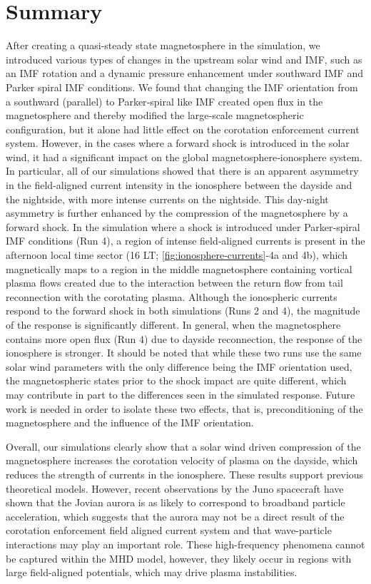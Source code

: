 \section{Summary}
After creating a quasi‐steady state magnetosphere in the simulation, we introduced various types of changes in the upstream solar wind and IMF, such as an IMF rotation and a dynamic pressure enhancement under southward IMF and Parker spiral IMF conditions. We found that changing the IMF orientation from a southward (parallel) to Parker‐spiral like IMF created open flux in the magnetosphere and thereby modified the large‐scale magnetospheric configuration, but it alone had little effect on the corotation enforcement current system. However, in the cases where a forward shock is introduced in the solar wind, it had a significant impact on the global magnetosphere‐ionosphere system. In particular, all of our simulations showed that there is an apparent asymmetry in the field‐aligned current intensity in the ionosphere between the dayside and the nightside, with more intense currents on the nightside. This day‐night asymmetry is further enhanced by the compression of the magnetosphere by a forward shock. In the simulation where a shock is introduced under Parker‐spiral IMF conditions (Run 4), a region of intense field‐aligned currents is present in the afternoon local time sector (16 LT; \ref{fig:ionosphere-currents}‐4a and 4b), which magnetically maps to a region in the middle magnetosphere containing vortical plasma flows created due to the interaction between the return flow from tail reconnection with the corotating plasma. Although the ionospheric currents respond to the forward shock in both simulations (Runs 2 and 4), the magnitude of the response is significantly different. In general, when the magnetosphere contains more open flux (Run 4) due to dayside reconnection, the response of the ionosphere is stronger. It should be noted that while these two runs use the same solar wind parameters with the only difference being the IMF orientation used, the magnetospheric states prior to the shock impact are quite different, which may contribute in part to the differences seen in the simulated response. Future work is needed in order to isolate these two effects, that is, preconditioning of the magnetosphere and the influence of the IMF orientation. 

Overall, our simulations clearly show that a solar wind driven compression of the magnetosphere increases the corotation velocity of plasma on the dayside, which reduces the strength of currents in the ionosphere. These results support previous theoretical models. However, recent observations by the Juno spacecraft have shown that the Jovian aurora is as likely to correspond to broadband particle acceleration, which suggests that the aurora may not be a direct result of the corotation enforcement field aligned current system and that wave-particle interactions may play an important role. These high-frequency phenomena cannot be captured within the MHD model, however, they likely occur in regions with large field-aligned potentials, which may drive plasma instabilities. 


